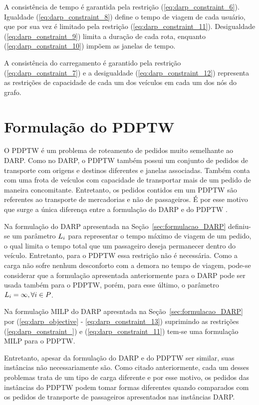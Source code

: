 A consistência de tempo é garantida pela restrição
(\ref{eq:darp_constraint_6}).
Igualdade (\ref{eq:darp_constraint_8}) define o tempo de viagem de cada
usuário, que por sua vez é limitado pela restrição
(\ref{eq:darp_constraint_11}).
Desigualdade (\ref{eq:darp_constraint_9}) limita a duração de cada
rota, enquanto (\ref{eq:darp_constraint_10}) impõem as janelas de tempo.


A consistência do carregamento é garantido pela restrição 
(\ref{eq:darp_constraint_7}) e a desigualdade (\ref{eq:darp_constraint_12})
representa as restrições de capacidade de cada um dos veículos em cada um dos
nós do grafo.





\section{Formulação do PDPTW}\label{sec:formulacao_PDPTW}

O PDPTW é um problema de roteamento de pedidos muito semelhante ao DARP.
Como no DARP, o PDPTW também possui um conjunto de pedidos de transporte com
origens e destinos diferentes e janelas associadas.
Também conta com uma frota de veículos com capacidade de transportar mais de um
pedido de maneira concomitante.
Entretanto, os pedidos contidos em um PDPTW são referentes ao transporte de
mercadorias e não de passageiros.
É por esse motivo que surge a única diferença entre a formulação do DARP e do
PDPTW \cite{parragh_survey_2008}.

Na formulação do DARP apresentada na Seção~\ref{sec:formulacao_DARP} definiu-se
um parâmetro $L_i$ para representar o tempo máximo de viagem
de um pedido, o qual limita o tempo total que um passageiro deseja permanecer
dentro do veículo.
Entretanto, para o PDPTW essa restrição não é necessária. Como a carga não
sofre nenhum desconforto com a demora no tempo de viagem, pode-se considerar 
que a formulação apresentada anteriormente para o DARP pode ser usada também 
para o PDPTW, porém, para esse último, o parâmetro 
$L_i = \infty, \forall i \in P$.

Na formulação MILP do DARP apresntada na Seção~\ref{sec:formulacao_DARP} por
(\ref{eq:darp_objective} - \ref{eq:darp_constraint_13}) suprimindo as
restrições (\ref{eq:darp_constraint_}) e (\ref{eq:darp_constraint_11}) 
tem-se uma formulação MILP para o PDPTW.

\iffalse
Entretanto, apesar da formulação do DARP e do PDPTW ser similar, suas
instâncias não necessariamente são.
Como citado anteriormente, cada um desses problemas trata de um tipo de carga
diferente e por esse motivo, os pedidos das instâncias do PDPTW podem tomar
formas diferentes quando comparados com os pedidos de transporte de passageiros
apresentados nas instâncias DARP.

